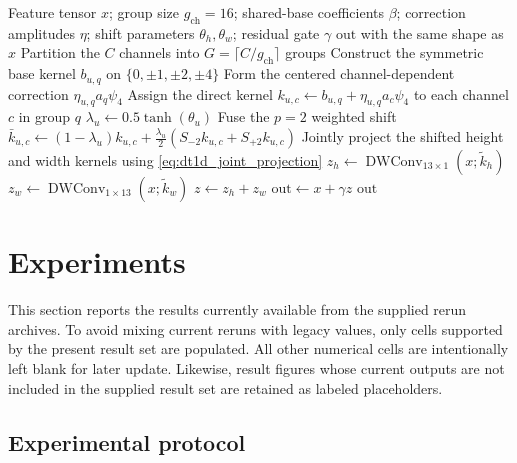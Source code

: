 \documentclass[pdflatex,sn-mathphys-num]{sn-jnl}
\theoremstyle{thmstyleone}
\theoremstyle{thmstyletwo}
\theoremstyle{thmstylethree}
\begin{document}
\begin{algorithm}[h]
\caption{DT1D-Adapter on a feature tensor}
\label{alg:dt1d}
\begin{algorithmic}[1]
\Require Feature tensor $x$; group size $g_{\mathrm{ch}}=16$; shared-base coefficients $\beta$; correction amplitudes $\eta$; shift parameters $\theta_h,\theta_w$; residual gate $\gamma$
\Ensure $\mathrm{out}$ with the same shape as $x$
\State Partition the $C$ channels into $G=\lceil C/g_{\mathrm{ch}}\rceil$ groups
  \State Construct the symmetric base kernel $b_{u,q}$ on $\{0,\pm1,\pm2,\pm4\}$
  \State Form the centered channel-dependent correction $\eta_{u,q}a_q\psi_4$
  \State Assign the direct kernel $k_{u,c}\gets b_{u,q}+\eta_{u,q}a_c\psi_4$ to each channel $c$ in group $q$
 \EndFor
 \State $\lambda_u\gets0.5\tanh(\theta_u)$
 \State Fuse the $p=2$ weighted shift $\bar{k}_{u,c}\gets(1-\lambda_u)k_{u,c}+\frac{\lambda_u}{2}(S_{-2}k_{u,c}+S_{+2}k_{u,c})$
\EndFor
\State Jointly project the shifted height and width kernels using \eqref{eq:dt1d_joint_projection}
\State $z_h\gets\operatorname{DWConv}_{13\times1}(x;\widetilde{k}_h)$
\State $z_w\gets\operatorname{DWConv}_{1\times13}(x;\widetilde{k}_w)$
\State $z\gets z_h+z_w$
\State $\mathrm{out}\gets x+\gamma z$
\State \Return $\mathrm{out}$
\end{algorithmic}
\end{algorithm}

\FloatBarrier



\section{Experiments}
\label{sec:impl-exp}

This section reports the results currently available from the supplied rerun archives. To avoid mixing current reruns with legacy values, only cells supported by the present result set are populated. All other numerical cells are intentionally left blank for later update. Likewise, result figures whose current outputs are not included in the supplied result set are retained as labeled placeholders.

\subsection{Experimental protocol}
\label{subsec:experimental_protocol}
\end{document}
